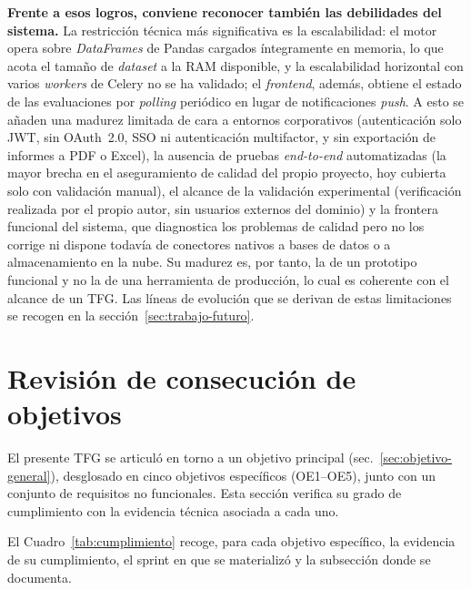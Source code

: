 \textbf{Frente a esos logros, conviene reconocer también las debilidades del
sistema.}  La restricción técnica más significativa es la escalabilidad: el
motor opera sobre \emph{DataFrames} de Pandas cargados íntegramente en memoria,
lo que acota el tamaño de \emph{dataset} a la RAM disponible, y la
escalabilidad horizontal con varios \emph{workers} de Celery no se ha validado;
el \emph{frontend}, además, obtiene el estado de las evaluaciones por
\emph{polling} periódico en lugar de notificaciones \emph{push}.  A esto se
añaden una madurez limitada de cara a entornos corporativos (autenticación solo
\ac{JWT}, sin OAuth~2.0, \ac{SSO} ni autenticación multifactor, y sin
exportación de informes a
\ac{PDF} o Excel), la ausencia de pruebas \emph{end-to-end} automatizadas (la
mayor brecha en el aseguramiento de calidad del propio proyecto, hoy cubierta
solo con validación manual), el alcance de la validación experimental
(verificación realizada por el propio autor, sin usuarios externos del dominio)
y la frontera funcional del sistema, que diagnostica los problemas de calidad
pero no los corrige ni dispone todavía de conectores nativos a bases de datos o
a almacenamiento en la nube.  Su madurez es, por tanto, la de un prototipo
funcional y no la de una herramienta de producción, lo cual es coherente con el
alcance de un \ac{TFG}.  Las líneas de evolución que se derivan de estas
limitaciones se recogen en la sección~\ref{sec:trabajo-futuro}.


\section{Revisión de consecución de objetivos}
\label{sec:revision-objetivos}

El presente \ac{TFG} se articuló en torno a un objetivo principal
(sec.~\ref{sec:objetivo-general}), desglosado en cinco objetivos específicos
(OE1--OE5), junto con un conjunto de requisitos no funcionales.  Esta sección
verifica su grado de cumplimiento con la evidencia técnica asociada a cada uno.

El Cuadro~\ref{tab:cumplimiento} recoge, para cada objetivo específico, la
evidencia de su cumplimiento, el sprint en que se materializó y la subsección
donde se documenta.

